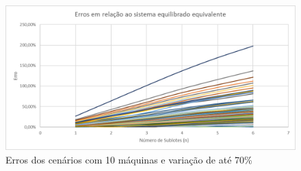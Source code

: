 \begin{figure}[!ht]
    \centering
    \includegraphics[width=12cm]{Resultados/Figuras/e10_70}
    \caption{Erros dos cenários com 10 máquinas e variação de até 70\%}
    \label{fig:e10_70}
\end{figure}